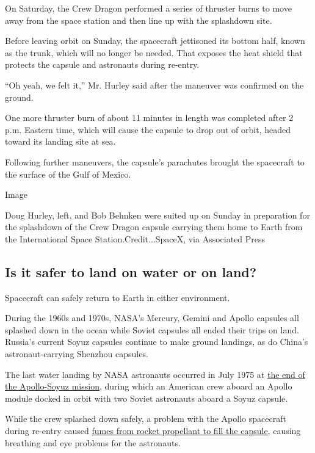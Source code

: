 On Saturday, the Crew Dragon performed a series of thruster burns to
move away from the space station and then line up with the splashdown
site.

Before leaving orbit on Sunday, the spacecraft jettisoned its bottom
half, known as the trunk, which will no longer be needed. That exposes
the heat shield that protects the capsule and astronauts during
re-entry.

``Oh yeah, we felt it,'' Mr. Hurley said after the maneuver was
confirmed on the ground.

One more thruster burn of about 11 minutes in length was completed after
2 p.m. Eastern time, which will cause the capsule to drop out of orbit,
headed toward its landing site at sea.

Following further maneuvers, the capsule's parachutes brought the
spacecraft to the surface of the Gulf of Mexico.

Image

Doug Hurley, left, and Bob Behnken were suited up on Sunday in
preparation for the splashdown of the Crew Dragon capsule carrying them
home to Earth from the International Space Station.Credit...SpaceX, via
Associated Press

\hypertarget{is-it-safer-to-land-on-water-or-on-land}{%
\subsection{Is it safer to land on water or on
land?}\label{is-it-safer-to-land-on-water-or-on-land}}

Spacecraft can safely return to Earth in either environment.

During the 1960s and 1970s, NASA's Mercury, Gemini and Apollo capsules
all splashed down in the ocean while Soviet capsules all ended their
trips on land. Russia's current Soyuz capsules continue to make ground
landings, as do China's astronaut-carrying Shenzhou capsules.

The last water landing by NASA astronauts occurred in July 1975 at
\href{https://www.nasa.gov/mission_pages/apollo-soyuz/index.html}{the
end of the Apollo-Soyuz mission}, during which an American crew aboard
an Apollo module docked in orbit with two Soviet astronauts aboard a
Soyuz capsule.

While the crew splashed down safely, a problem with the Apollo
spacecraft during re-entry caused
\href{https://history.nasa.gov/apollo/apsoyhist.html}{fumes from rocket
propellant to fill the capsule}, causing breathing and eye problems for
the astronauts.

